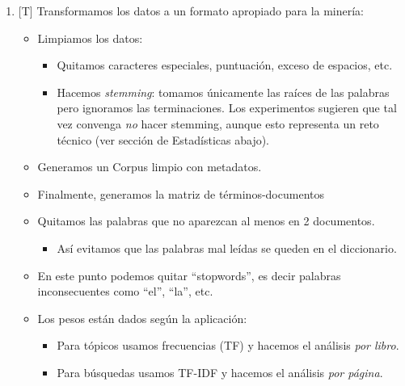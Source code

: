 \begin{enumerate}
\def\labelenumi{\arabic{enumi}.}
\setcounter{enumi}{1}
\itemsep1pt\parskip0pt
\item
  {[}T{]} Transformamos los datos a un formato apropiado para la
  minería:

  \begin{itemize}
  \itemsep1pt\parskip0pt
  \item
    Limpiamos los datos:

    \begin{itemize}
    \itemsep1pt\parskip0pt
    \item
      Quitamos caracteres especiales, puntuación, exceso de espacios,
      etc.
    \item
      Hacemos \emph{stemming}: tomamos únicamente las raíces de las
      palabras pero ignoramos las terminaciones. Los experimentos
      sugieren que tal vez convenga \emph{no} hacer stemming, aunque
      esto representa un reto técnico (ver sección de Estadísticas
      abajo).
    \end{itemize}
  \item
    Generamos un Corpus limpio con metadatos.
  \item
    Finalmente, generamos la matriz de términos-documentos
  \item
    Quitamos las palabras que no aparezcan al menos en 2 documentos.

    \begin{itemize}
    \itemsep1pt\parskip0pt
    \item
      Así evitamos que las palabras mal leídas se queden en el
      diccionario.
    \end{itemize}
  \item
    En este punto podemos quitar ``stopwords'', es decir palabras
    inconsecuentes como ``el'', ``la'', etc.
  \item
    Los pesos están dados según la aplicación:

    \begin{itemize}
    \itemsep1pt\parskip0pt
    \item
      Para tópicos usamos frecuencias (TF) y hacemos el análisis
      \emph{por libro}.
    \item
      Para búsquedas usamos TF-IDF y hacemos el análisis \emph{por
      página}.
    \end{itemize}
  \end{itemize}
\end{enumerate}

